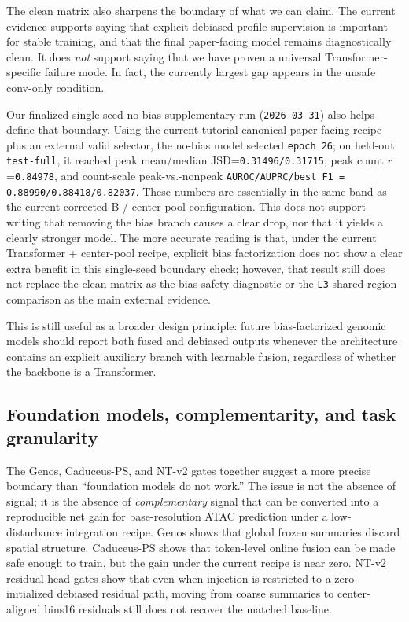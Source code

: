 \documentclass[11pt,a4paper]{article}
\begin{document}
The clean matrix also sharpens the boundary of what we can claim. The
current evidence supports saying that explicit debiased profile
supervision is important for stable training, and that the final
paper-facing model remains diagnostically clean. It does \emph{not}
support saying that we have proven a universal Transformer-specific
failure mode. In fact, the currently largest gap appears in the unsafe
conv-only condition.

Our finalized single-seed no-bias supplementary run (\texttt{2026-03-31}) also
helps define that boundary. Using the current tutorial-canonical
paper-facing recipe plus an external valid selector, the no-bias model
selected \texttt{epoch 26}; on held-out \texttt{test-full}, it reached peak
mean/median JSD=\texttt{0.31496/0.31715}, peak count $r$=\texttt{0.84978}, and
count-scale peak-vs.-nonpeak \texttt{AUROC/AUPRC/best F1 =
0.88990/0.88418/0.82037}. These numbers are essentially in the same
band as the current corrected-B / center-pool configuration. This does
not support writing that removing the bias branch causes a clear drop,
nor that it yields a clearly stronger model. The more accurate reading
is that, under the current Transformer + center-pool recipe, explicit
bias factorization does not show a clear extra benefit in this
single-seed boundary check; however, that result still does not replace
the clean matrix as the bias-safety diagnostic or the \texttt{L3}
shared-region comparison as the main external evidence.

This is still useful as a broader design principle: future
bias-factorized genomic models should report both fused and debiased
outputs whenever the architecture contains an explicit auxiliary branch
with learnable fusion, regardless of whether the backbone is a
Transformer.

\subsection{Foundation models, complementarity, and task granularity}

The Genos, Caduceus-PS, and NT-v2 gates together suggest a more precise
boundary than ``foundation models do not work.'' The issue is not the
absence of signal; it is the absence of \emph{complementary} signal that
can be converted into a reproducible net gain for base-resolution ATAC
prediction under a low-disturbance integration recipe. Genos shows that
global frozen summaries discard spatial structure. Caduceus-PS shows that
token-level online fusion can be made safe enough to train, but the gain
under the current recipe is near zero. NT-v2 residual-head gates show
that even when injection is restricted to a zero-initialized debiased
residual path, moving from coarse summaries to center-aligned bins16
residuals still does not recover the matched baseline.
\end{document}
